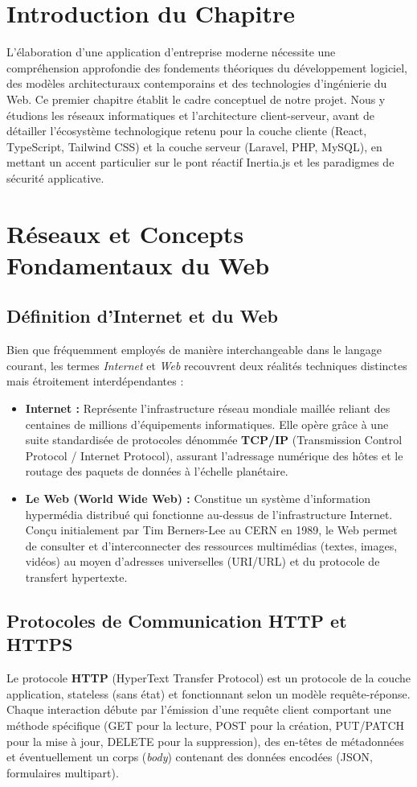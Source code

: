 \documentclass{bts-report}
\begin{document}
\section*{Introduction du Chapitre}
L'\'elaboration d'une application d'entreprise moderne n\'ecessite une compr\'ehension approfondie des fondements th\'eoriques du d\'eveloppement logiciel, des mod\`eles architecturaux contemporains et des technologies d'ing\'enierie du Web. Ce premier chapitre \'etablit le cadre conceptuel de notre projet. Nous y \'etudions les r\'eseaux informatiques et l'architecture client-serveur, avant de d\'etailler l'\'ecosyst\`eme technologique retenu pour la couche cliente (React, TypeScript, Tailwind CSS) et la couche serveur (Laravel, PHP, MySQL), en mettant un accent particulier sur le pont r\'eactif Inertia.js et les paradigmes de s\'ecurit\'e applicative.

\section{R\'eseaux et Concepts Fondamentaux du Web}
\subsection{D\'efinition d'Internet et du Web}
Bien que fr\'equemment employ\'es de mani\`ere interchangeable dans le langage courant, les termes \textit{Internet} et \textit{Web} recouvrent deux r\'ealit\'es techniques distinctes mais \'etroitement interd\'ependantes :
\begin{itemize}
  \item \textbf{Internet :} Repr\'esente l'infrastructure r\'eseau mondiale maill\'ee reliant des centaines de millions d'\'equipements informatiques. Elle op\`ere gr\^ace \`a une suite standardis\'ee de protocoles d\'enomm\'ee \textbf{TCP/IP} (Transmission Control Protocol / Internet Protocol), assurant l'adressage num\'erique des h\^otes et le routage des paquets de donn\'ees \`a l'\'echelle plan\'etaire.
  \item \textbf{Le Web (World Wide Web) :} Constitue un syst\`eme d'information hyperm\'edia distribu\'e qui fonctionne au-dessus de l'infrastructure Internet. Con\c{c}u initialement par Tim Berners-Lee au CERN en 1989, le Web permet de consulter et d'interconnecter des ressources multim\'edias (textes, images, vid\'eos) au moyen d'adresses universelles (URI/URL) et du protocole de transfert hypertexte.
\end{itemize}

\subsection{Protocoles de Communication HTTP et HTTPS}
Le protocole \textbf{HTTP} (HyperText Transfer Protocol) est un protocole de la couche application, stateless (sans \'etat) et fonctionnant selon un mod\`ele requ\^ete-r\'eponse. Chaque interaction d\'ebute par l'\'emission d'une requ\^ete client comportant une m\'ethode sp\'ecifique (GET pour la lecture, POST pour la cr\'eation, PUT/PATCH pour la mise \`a jour, DELETE pour la suppression), des en-t\^etes de m\'etadonn\'ees et \'eventuellement un corps (\textit{body}) contenant des donn\'ees encod\'ees (JSON, formulaires multipart).
\end{document}
